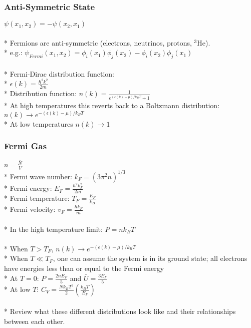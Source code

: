 \subsubsection{Anti-Symmetric State}
\(\psi(x_1,x_2)=-\psi(x_2,x_1)\)\\\\*
Fermions are anti-symmetric (electrons, neutrinos, protons, \(^3\)He).\\*
e.g.: \(\psi_{Fermi}(x_1,x_2)=\phi_i(x_1)\phi_j(x_2)-\phi_i(x_2)\phi_j(x_1)\)\\\\*
%
Fermi-Dirac distribution function:\\*
\(\displaystyle\epsilon(k)=\frac{\hbar^2k^2}{2m}\)\\*
Distribution function: \(\displaystyle n(k)=\frac{1}{e^{(\epsilon(k)-\mu)/k_BT}+1}\)\\*
At high temperatures this reverts back to a Boltzmann distribution: \(\displaystyle n(k)\rightarrow e^{-(\epsilon(k)-\mu)/k_BT}\)\\*
At low temperatures \(n(k)\rightarrow1\)
%
\subsubsection{Fermi Gas}
\(n=\frac{\bar{N}}{V}\)\\*
Fermi wave number: \(k_F=\left(3\pi^2n\right)^{1/3}\)\\*
Fermi energy: \(\displaystyle E_F=\frac{\hbar^2k_F^2}{2m}\)\\*
Fermi temperature: \(\displaystyle T_F=\frac{E_F}{k_B}\)\\*
Fermi velocity: \(\displaystyle v_F=\frac{\hbar k_F}{m}\)\\\\*
%
In the high temperature limit: \(P=nk_BT\)\\\\*
When \(T>T_F\), \(\displaystyle n(k)\rightarrow e^{-(\epsilon(k)-\mu)/k_BT}\)\\*
When \(T\ll T_F\), one can assume the system is in its ground state; all electrons have energies less than or equal to the Fermi energy\\*
At \(T=0\): \(\displaystyle P=\frac{2nE_F}{5}\) and \(\displaystyle \bar{U}=\frac{3E_F}{5}\)\\*
At low \(T\): \(\displaystyle C_V=\frac{Nk_BT^2}{2}\left(\frac{k_BT}{E_F}\right)\)\\\\*
%
Review what these different distributions look like and their relationships between each other.

